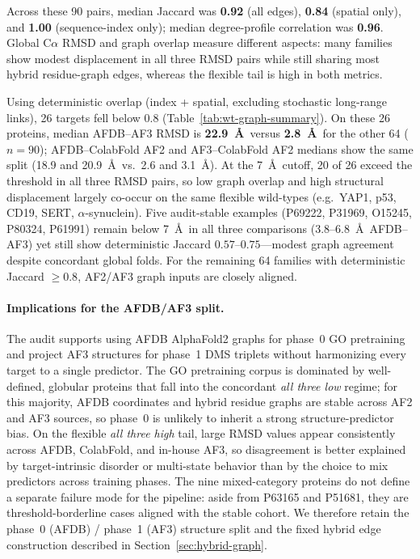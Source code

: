 \documentclass[11pt,a4paper]{article}
\begin{document}
Across these 90 pairs, median Jaccard was \textbf{0.92} (all edges), \textbf{0.84} (spatial only), and \textbf{1.00} (sequence-index only); median degree-profile correlation was \textbf{0.96}. Global C$\alpha$ RMSD and graph overlap measure different aspects: many families show modest displacement in all three RMSD pairs while still sharing most hybrid residue-graph edges, whereas the flexible tail is high in both metrics.

Using deterministic overlap (index + spatial, excluding stochastic long-range links), 26 targets fell below 0.8 (Table~\ref{tab:wt-graph-summary}). On these 26 proteins, median AFDB--AF3 RMSD is \textbf{22.9~\AA}\ versus \textbf{2.8~\AA}\ for the other 64 ($n{=}90$); AFDB--ColabFold AF2 and AF3--ColabFold AF2 medians show the same split (18.9 and 20.9~\AA\ vs.\ 2.6 and 3.1~\AA). At the 7~\AA\ cutoff, 20 of 26 exceed the threshold in all three RMSD pairs, so low graph overlap and high structural displacement largely co-occur on the same flexible wild-types (e.g.\ YAP1, p53, CD19, SERT, $\alpha$-synuclein). Five audit-stable examples (P69222, P31969, O15245, P80324, P61991) remain below 7~\AA\ in all three comparisons (3.8--6.8~\AA\ AFDB--AF3) yet still show deterministic Jaccard $0.57$--$0.75$---modest graph agreement despite concordant global folds. For the remaining 64 families with deterministic Jaccard $\geq 0.8$, AF2/AF3 graph inputs are closely aligned.

\paragraph{Implications for the AFDB/AF3 split.}
The audit supports using AFDB AlphaFold2 graphs for phase~0 GO pretraining and project AF3 structures for phase~1 DMS triplets without harmonizing every target to a single predictor. The GO pretraining corpus is dominated by well-defined, globular proteins that fall into the concordant \emph{all three low} regime; for this majority, AFDB coordinates and hybrid residue graphs are stable across AF2 and AF3 sources, so phase~0 is unlikely to inherit a strong structure-predictor bias. On the flexible \emph{all three high} tail, large RMSD values appear consistently across AFDB, ColabFold, and in-house AF3, so disagreement is better explained by target-intrinsic disorder or multi-state behavior than by the choice to mix predictors across training phases. The nine mixed-category proteins do not define a separate failure mode for the pipeline: aside from P63165 and P51681, they are threshold-borderline cases aligned with the stable cohort. We therefore retain the phase~0 (AFDB) / phase~1 (AF3) structure split and the fixed hybrid edge construction described in Section~\ref{sec:hybrid-graph}.
\end{document}
